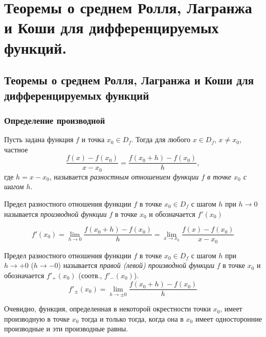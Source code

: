 \chapter{Теоремы о среднем Ролля, Лагранжа и Коши для дифференцируемых функций.}


\section{Теоремы о среднем Ролля, Лагранжа и Коши для дифференцируемых функций}

\subsection{Определение производной}

Пусть задана функция $f$ и точка $x_0\in D_f$. Тогда для любого $x \in D_f$, $x\ne x_0$, частное
\begin{equation}\label{ya3e1}
\frac{f(x)-f(x_0)}{x-x_0}=\frac{f(x_0+h)-f(x_0)}{h}, 
\end{equation}
где $h=x-x_0$, называется \textit{разностным отношением функции $f$ в точке $x_0$ с шагом $h$}.

\begin{defn}
\label{ya3d1}
Предел разностного отношения функции $f$ в точке $x_0 \in D_f$ с шагом $h$ при $h \to 0$ называется \textit{производной функции} $f$ в точке $x_0$ и обозначается $f'(x_0)$

\begin{equation}\label{ya3e2}
f'(x_0)=\lim_{h\to 0}\limits\frac{f(x_0+h)-f(x_0)}{h}=\lim_{x\to x_0}\limits \frac{f(x)-f(x_0)}{x-x_0}
\end{equation}

\end{defn}
\begin{defn} Предел разностного отношения функции $f$ в точке $x_0 \in D_f$ с шагом $h$ при $h \to +0 $ ($h \to -0$) называется \textit{правой (левой) производной функции} $f$ в точке $x_0$ и обозначается $f'_+(x_0)$ (соотв., $f'_-(x_0)$).
\begin{equation}\label{ya3e3}
f'_\pm(x_0)=\lim_{h\to \pm0}\limits\frac{f(x_0+h)-f(x_0)}{h}
\end{equation}
\end{defn}

Очевидно, функция, определенная в некоторой окрестности точки $x_0$, имеет производную в точке $x_0$ тогда и только тогда, когда она в $x_0$ имеет односторонние производные и эти производные равны.

